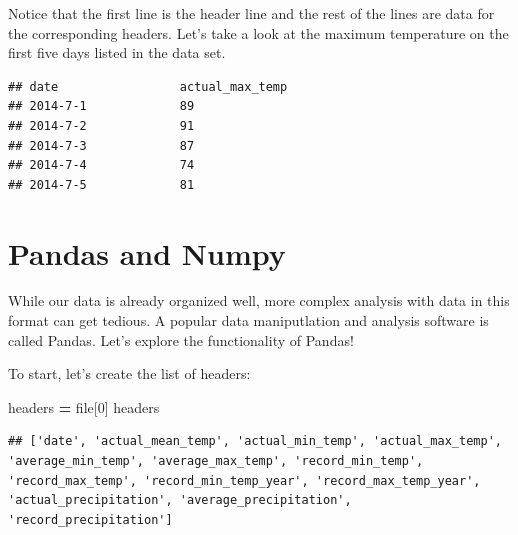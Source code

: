 \documentclass[]{book}
\newenvironment{Shaded}{\begin{snugshade}}{\end{snugshade}}
\newcommand{\KeywordTok}[1]{\textcolor[rgb]{0.13,0.29,0.53}{\textbf{#1}}}
\newcommand{\DecValTok}[1]{\textcolor[rgb]{0.00,0.00,0.81}{#1}}
\newcommand{\SpecialCharTok}[1]{\textcolor[rgb]{0.00,0.00,0.00}{#1}}
\newcommand{\StringTok}[1]{\textcolor[rgb]{0.31,0.60,0.02}{#1}}
\newcommand{\CommentTok}[1]{\textcolor[rgb]{0.56,0.35,0.01}{\textit{#1}}}
\newcommand{\ControlFlowTok}[1]{\textcolor[rgb]{0.13,0.29,0.53}{\textbf{#1}}}
\newcommand{\OperatorTok}[1]{\textcolor[rgb]{0.81,0.36,0.00}{\textbf{#1}}}
\newcommand{\BuiltInTok}[1]{#1}
\newcommand{\NormalTok}[1]{#1}
\begin{document}
Notice that the first line is the header line and the rest of the lines
are data for the corresponding headers. Let's take a look at the maximum
temperature on the first five days listed in the data set.

\begin{Shaded}
\end{Shaded}

\begin{verbatim}
## date                 actual_max_temp
## 2014-7-1             89
## 2014-7-2             91
## 2014-7-3             87
## 2014-7-4             74
## 2014-7-5             81
\end{verbatim}

\section{Pandas and Numpy}\label{pandas-and-numpy}

While our data is already organized well, more complex analysis with
data in this format can get tedious. A popular data maniputlation and
analysis software is called Pandas. Let's explore the functionality of
Pandas!

To start, let's create the list of headers:

\begin{Shaded}
\begin{Highlighting}[]
\NormalTok{headers }\OperatorTok{=} \BuiltInTok{file}\NormalTok{[}\DecValTok{0}\NormalTok{]}
\NormalTok{headers}
\end{Highlighting}
\end{Shaded}

\begin{verbatim}
## ['date', 'actual_mean_temp', 'actual_min_temp', 'actual_max_temp', 'average_min_temp', 'average_max_temp', 'record_min_temp', 'record_max_temp', 'record_min_temp_year', 'record_max_temp_year', 'actual_precipitation', 'average_precipitation', 'record_precipitation']
\end{verbatim}
\end{document}

